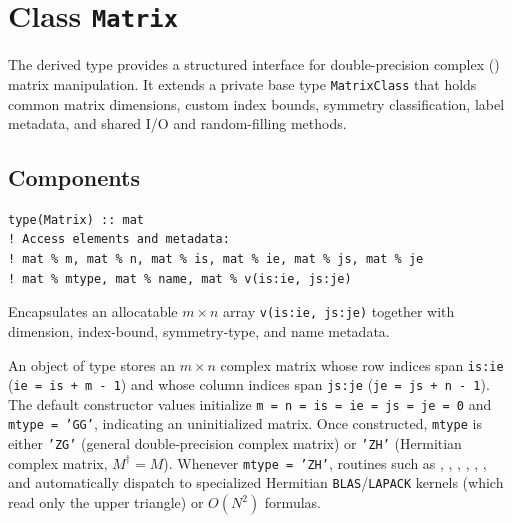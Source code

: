 \section{Class \texttt{Matrix}}
\label{sec:class_matrix}

The  derived type provides a structured interface for double-precision complex () matrix manipulation. It extends a private base type \texttt{MatrixClass} that holds common matrix dimensions, custom index bounds, symmetry classification, label metadata, and shared I/O and random-filling methods.

\subsection{Components}
\label{subsec:mat_components}


\lstset{language=[95]Fortran}
\begin{lstlisting}
type(Matrix) :: mat
! Access elements and metadata:
! mat % m, mat % n, mat % is, mat % ie, mat % js, mat % je
! mat % mtype, mat % name, mat % v(is:ie, js:je)
\end{lstlisting}

Encapsulates an allocatable $m \times n$  array \texttt{v(is:ie, js:je)} together with dimension, index-bound, symmetry-type, and name metadata.

An object of type  stores an $m \times n$ complex matrix whose row indices span \texttt{is:ie} (\texttt{ie = is + m - 1}) and whose column indices span \texttt{js:je} (\texttt{je = js + n - 1}). The default constructor values initialize \texttt{m = n = is = ie = js = je = 0} and \texttt{mtype = 'GG'}, indicating an uninitialized matrix. Once constructed, \texttt{mtype} is either \texttt{'ZG'} (general double-precision complex matrix) or \texttt{'ZH'} (Hermitian complex matrix, $M^\dagger = M$). Whenever \texttt{mtype = 'ZH'}, routines such as \procname{*}, , , , , , and  automatically dispatch to specialized Hermitian \texttt{BLAS}/\texttt{LAPACK} kernels (which read only the upper triangle) or $O(N^2)$ formulas.

